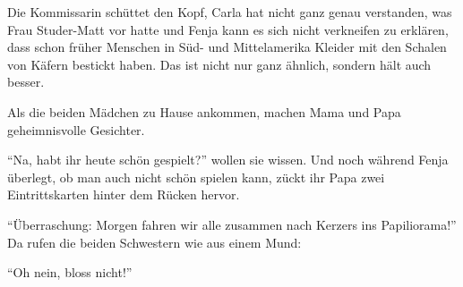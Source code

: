 Die Kommissarin schüttet den Kopf, Carla hat nicht ganz genau verstanden, was Frau Studer-Matt vor hatte und Fenja kann es sich nicht verkneifen zu erklären, dass schon früher Menschen in Süd- und Mittelamerika Kleider mit den Schalen von Käfern bestickt haben. Das ist nicht nur ganz ähnlich, sondern hält auch besser. 

Als die beiden Mädchen zu Hause ankommen, machen Mama und Papa geheimnisvolle Gesichter. 

\enquote{Na, habt ihr heute schön gespielt?} wollen sie wissen. Und noch während Fenja überlegt, ob man auch nicht schön spielen kann, zückt ihr Papa zwei Eintrittskarten hinter dem Rücken hervor.

\enquote{Überraschung: Morgen fahren wir alle zusammen nach Kerzers ins Papiliorama!} Da rufen die beiden Schwestern wie aus einem Mund:

\enquote{Oh nein, bloss nicht!} \hfill {\color{red}\decofourleft}

